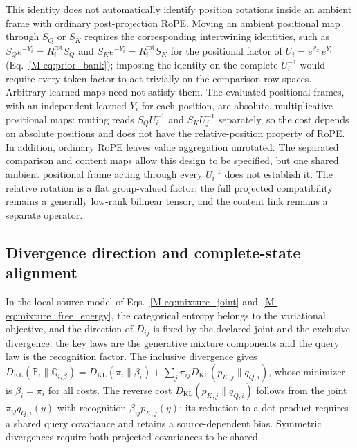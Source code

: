 \documentclass[twoside,11pt]{article}
\begin{document}
This identity does not automatically identify position rotations inside an ambient frame with ordinary post-projection RoPE. Moving an ambient positional map through $S_Q$ or $S_K$ requires the corresponding intertwining identities, such as $S_Qe^{-Y_i}=R^{\mathrm{rot}}_iS_Q$ and $S_Ke^{-Y_i}=R^{\mathrm{rot}}_iS_K$ for the positional factor of $U_i=e^{\phi_{x_i}}e^{Y_i}$ (Eq.~\eqref{M-eq:prior_bank}); imposing the identity on the complete $U_i^{-1}$ would require every token factor to act trivially on the comparison row spaces. Arbitrary learned maps need not satisfy them. The evaluated positional frames, with an independent learned $Y_i$ for each position, are absolute, multiplicative positional maps: routing reads $S_QU_i^{-1}$ and $S_KU_j^{-1}$ separately, so the cost depends on absolute positions and does not have the relative-position property of RoPE. In addition, ordinary RoPE leaves value aggregation unrotated. The separated comparison and content maps allow this design to be specified, but one shared ambient positional frame acting through every $U_i^{-1}$ does not establish it. The relative rotation is a flat group-valued factor; the full projected compatibility remains a generally low-rank bilinear tensor, and the content link remains a separate operator.

\subsection{Divergence direction and complete-state alignment}
\label{supp:divergence_alignment}

In the local source model of Eqs.~\eqref{M-eq:mixture_joint} and~\eqref{M-eq:mixture_free_energy}, the categorical entropy belongs to the variational objective, and the direction of $D_{ij}$ is fixed by the declared joint and the exclusive divergence: the key laws are the generative mixture components and the query law is the recognition factor. The inclusive divergence gives $D_{\mathrm{KL}}(\mathbb P_i\|\mathbb Q_{i,\beta})=D_{\mathrm{KL}}(\pi_i\|\beta_i)+\sum_j\pi_{ij}D_{\mathrm{KL}}(p_{K,j}\|q_{Q,i})$, whose minimizer is $\beta_i=\pi_i$ for all costs. The reverse cost $D_{\mathrm{KL}}(p_{K,j}\|q_{Q,i})$ follows from the joint $\pi_{ij}q_{Q,i}(y)$ with recognition $\beta_{ij}p_{K,j}(y)$; its reduction to a dot product requires a shared query covariance and retains a source-dependent bias. Symmetric divergences require both projected covariances to be shared.
\end{document}
